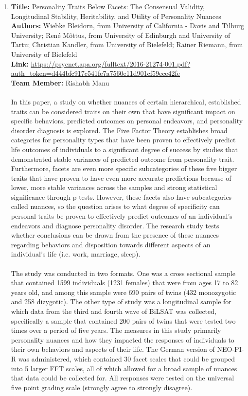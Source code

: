 \documentclass[letterpaper, 12 pt, conference]{article}
\begin{document}
\begin{enumerate}
    \item
    \textbf{Title: }Personality Traits Below Facets: The Consensual Validity, Longitudinal Stability, Heritability, and Utility of Personality Nuances
     \\ 
     \textbf{Authors:} Wiebke Bleidorn, from University of California - Davis and Tilburg University; René Mõttus, from University of Edinburgh and University of Tartu; Christian Kandler, from University of Bielefeld; Rainer Riemann, from University of Bielefeld
    \\
    \textbf{Link: } 
    \url{https://psycnet.apa.org/fulltext/2016-21274-001.pdf?auth_token=d444bfc917c541fe7a7560e11d901cf59ece42fe}
    \\
    \textbf{Team Member: } Rishabh Manu
    \\
    \\
    In this paper, a study on whether nuances of certain hierarchical, established traits can be considered traits on their own that have significant impact on specific behaviors, predicted outcomes on personal endeavors, and personality disorder diagnosis is explored. The Five Factor Theory establishes broad categories for personality types that have been proven to effectively predict life outcomes of individuals to a significant degree of success by studies that demonstrated stable variances of predicted outcome from personality trait. Furthermore, facets are even more specific subcategories of these five bigger traits that have proven to have even more accurate predictions because of lower, more stable variances across the samples and strong statistical significance through p tests. However, these facets also have subcategories called nuances, so the question arises to what degree of specificity can personal traits be proven to effectively predict outcomes of an individual’s endeavors and diagnose personality disorder. The research study tests whether conclusions can be drawn from the presence of these nuances regarding behaviors and disposition towards different aspects of an individual’s life (i.e. work, marriage, sleep). 
\\
\\
The study was conducted in two formats. One was a cross sectional sample that contained 1599 individuals (1231 females) that were from ages 17 to 82 years old, and among this sample were 690 pairs of twins (432 monozygotic and 258 dizygotic). The other type of study was a longitudinal sample for which data from the third and fourth wave of BiLSAT was collected, specifically a sample that contained 200 pairs of twins that were tested two times over a period of five years. The measures in this study primarily personality nuances and how they impacted the responses of individuals to their own behaviors and aspects of their life. The German version of NEO-PI-R was administered, which contained 30 facet scales that could be grouped into 5 larger FFT scales, all of which allowed for a broad sample of nuances that data could be collected for. All responses were tested on the universal five point grading scale (strongly agree to strongly disagree). 

\end{enumerate}
\end{document}
